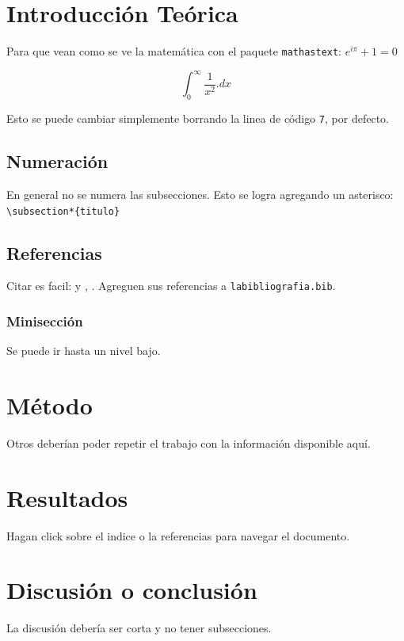 \documentclass[onecolumn,10pt,titlepage]{article}
\begin{document}
\section{Introducción Teórica}
Para que vean como se ve la matemática con el paquete \verb|mathastext|:
$e^{i\pi}+1=0$ 

$$\int^\infty_0 \frac{1}{x^2}.dx $$

Esto se puede cambiar simplemente borrando la linea de código \verb|7|, por defecto.

\subsection*{Numeración}
En general no se numera las subsecciones. Esto se logra agregando un asterisco: \verb|\subsection*{titulo}|
\subsection*{Referencias}
Citar es facil:
\citet*[pag. 4]{silverstein1964giving}
y \cite{serway2010fisica}, \citep{Erdos65}. Agreguen sus referencias a \verb|labibliografia.bib|.

\subsubsection*{Minisección}
Se puede ir hasta un nivel bajo.
\section{Método}
Otros deberían poder repetir el trabajo con la información disponible aquí.
\section{Resultados}
Hagan click sobre el indice o la referencias para navegar el documento.
\section{Discusión o conclusión}
La discusión debería ser corta y no tener subsecciones.

\clearpage 


 
\end{document}
